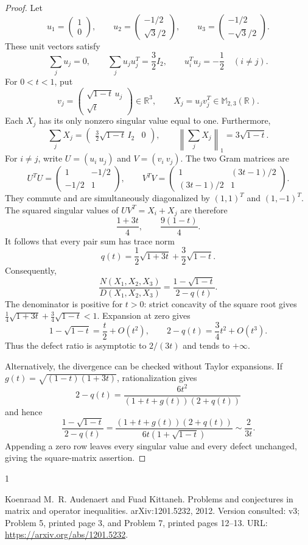 \documentclass[10pt,a4paper]{article}
\theoremstyle{remark}
\newcommand{\M}{\mathbb M}
\newcommand{\R}{\mathbb R}
\begin{document}
\begin{proof}
Let
\[
 u_1=\begin{pmatrix}1\\0\end{pmatrix},\qquad
 u_2=\begin{pmatrix}-1/2\\\sqrt3/2\end{pmatrix},\qquad
 u_3=\begin{pmatrix}-1/2\\-\sqrt3/2\end{pmatrix}.
\]
These unit vectors satisfy
\[
 \sum_ju_j=0,\qquad \sum_ju_ju_j^T=\frac32I_2,\qquad
 u_i^Tu_j=-\frac12\quad(i\ne j).
\]
For $0<t<1$, put
\[
 v_j=\begin{pmatrix}\sqrt{1-t}\,u_j\\\sqrt t\end{pmatrix}\in\R^3,
 \qquad X_j=u_jv_j^T\in\M_{2,3}(\R).
\]
Each $X_j$ has its only nonzero singular value equal to one. Furthermore,
\[
 \sum_jX_j=\begin{pmatrix}\frac32\sqrt{1-t}\,I_2&0\end{pmatrix},
 \qquad\left\|\sum_jX_j\right\|_1=3\sqrt{1-t}.
\]
For $i\ne j$, write $U=(u_i\ u_j)$ and $V=(v_i\ v_j)$. The two Gram matrices are
\[
 U^TU=\begin{pmatrix}1&-1/2\\-1/2&1\end{pmatrix},\qquad
 V^TV=\begin{pmatrix}1&(3t-1)/2\\(3t-1)/2&1\end{pmatrix}.
\]
They commute and are simultaneously diagonalized by $(1,1)^T$ and $(1,-1)^T$. The squared singular values of $UV^T=X_i+X_j$ are therefore
\[
 \frac{1+3t}{4},\qquad\frac{9(1-t)}4.
\]
It follows that every pair sum has trace norm
\[
 q(t)=\frac12\sqrt{1+3t}+\frac32\sqrt{1-t}.
\]
Consequently,
\[
 \frac{N(X_1,X_2,X_3)}{D(X_1,X_2,X_3)}
 =\frac{1-\sqrt{1-t}}{2-q(t)}.
\]
The denominator is positive for $t>0$: strict concavity of the square root gives
$\frac14\sqrt{1+3t}+\frac34\sqrt{1-t}<1$.
Expansion at zero gives
\[
 1-\sqrt{1-t}=\frac t2+O(t^2),\qquad
 2-q(t)=\frac34t^2+O(t^3).
\]
Thus the defect ratio is asymptotic to $2/(3t)$ and tends to $+\infty$.

Alternatively, the divergence can be checked without Taylor expansions. If
$g(t)=\sqrt{(1-t)(1+3t)}$, rationalization gives
\[
 2-q(t)=\frac{6t^2}{(1+t+g(t))(2+q(t))}
\]
and hence
\[
 \frac{1-\sqrt{1-t}}{2-q(t)}
 =\frac{(1+t+g(t))(2+q(t))}{6t(1+\sqrt{1-t})}
 \sim\frac{2}{3t}.
\]
Appending a zero row leaves every singular value and every defect unchanged, giving the square-matrix assertion.
\end{proof}

\begin{thebibliography}{1}

Koenraad M.~R. Audenaert and Fuad Kittaneh.
\newblock Problems and conjectures in matrix and operator inequalities.
\newblock arXiv:1201.5232, 2012.
\newblock Version consulted: v3; Problem 5, printed page 3, and Problem 7,
  printed pages 12--13.
\newblock URL: \url{https://arxiv.org/abs/1201.5232}.

\end{thebibliography}
\end{document}
